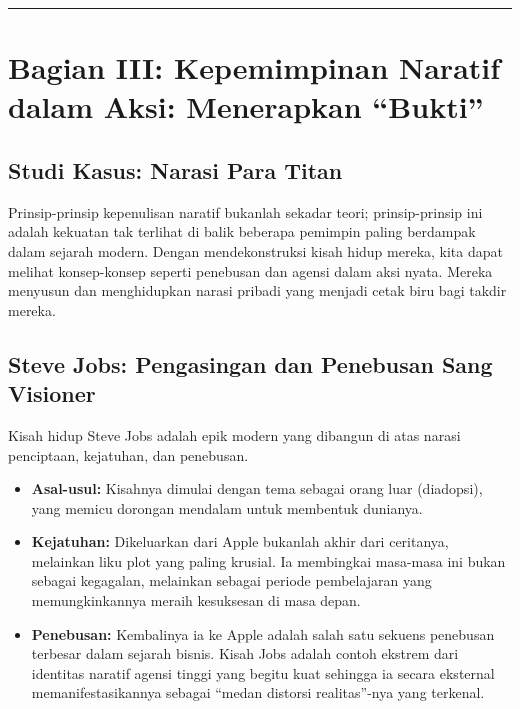 \documentclass[
  letterpaper,
  DIV=11,
  numbers=noendperiod]{scrreprt}
\begin{document}
\begin{center}\rule{0.5\linewidth}{0.5pt}\end{center}

\section{Bagian III: Kepemimpinan Naratif dalam Aksi: Menerapkan
``Bukti''}\label{bagian-iii-kepemimpinan-naratif-dalam-aksi-menerapkan-bukti}

\subsection{Studi Kasus: Narasi Para
Titan}\label{studi-kasus-narasi-para-titan}

Prinsip-prinsip kepenulisan naratif bukanlah sekadar teori;
prinsip-prinsip ini adalah kekuatan tak terlihat di balik beberapa
pemimpin paling berdampak dalam sejarah modern. Dengan mendekonstruksi
kisah hidup mereka, kita dapat melihat konsep-konsep seperti penebusan
dan agensi dalam aksi nyata. Mereka menyusun dan menghidupkan narasi
pribadi yang menjadi cetak biru bagi takdir mereka.

\subsection{Steve Jobs: Pengasingan dan Penebusan Sang
Visioner}\label{steve-jobs-pengasingan-dan-penebusan-sang-visioner}

Kisah hidup Steve Jobs adalah epik modern yang dibangun di atas narasi
penciptaan, kejatuhan, dan penebusan.

\begin{itemize}
\item
  \textbf{Asal-usul:} Kisahnya dimulai dengan tema sebagai orang luar
  (diadopsi), yang memicu dorongan mendalam untuk membentuk dunianya.
\item
  \textbf{Kejatuhan:} Dikeluarkan dari Apple bukanlah akhir dari
  ceritanya, melainkan liku plot yang paling krusial. Ia membingkai
  masa-masa ini bukan sebagai kegagalan, melainkan sebagai periode
  pembelajaran yang memungkinkannya meraih kesuksesan di masa depan.
\item
  \textbf{Penebusan:} Kembalinya ia ke Apple adalah salah satu sekuens
  penebusan terbesar dalam sejarah bisnis. Kisah Jobs adalah contoh
  ekstrem dari identitas naratif agensi tinggi yang begitu kuat sehingga
  ia secara eksternal memanifestasikannya sebagai ``medan distorsi
  realitas''-nya yang terkenal.
\end{itemize}
\end{document}
